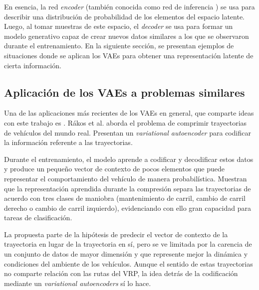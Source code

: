 
En esencia, la red \textit{encoder} (también conocida como red de inferencia \cite{BengioGood} ) se usa para describir una distribución de probabilidad de los elementos del espacio latente. Luego, al tomar muestras de este espacio, el \textit{decoder} se usa para formar un modelo generativo capaz de crear nuevos datos similares a los que se observaron durante el entrenamiento. En la siguiente sección, se presentan ejemplos de situaciones donde se aplican los VAEs para obtener una representación latente de cierta información.


\subsection{Aplicación de los VAEs a problemas similares}

Una de las aplicaciones más recientes de los VAEs en general, que comparte ideas con este trabajo es \cite{TrajectoryCompres}. Rákos et al. aborda el problema de comprimir trayectorias de vehículos del mundo real. Presentan un \textit{variational autoencoder} para codificar la información referente a las trayectorias. 

Durante el entrenamiento, el modelo aprende a codificar y decodificar estos datos y produce un pequeño vector de contexto de pocos elementos que puede representar el comportamiento del vehículo de manera probabilística. Muestran que la representación aprendida durante la compresión separa las trayectorias de acuerdo con tres clases de maniobra (mantenimiento de carril, cambio de carril derecho o cambio de carril izquierdo), evidenciando con ello gran capacidad para tareas de clasificación. 

 La propuesta parte de la hipótesis de predecir el vector de contexto de la trayectoria en lugar de la trayectoria en sí, pero se ve limitada por la carencia de un conjunto de datos de mayor dimensión y que represente mejor la dinámica y condiciones del ambiente de los vehículos. Aunque el sentido de estas trayectorias no comparte relación con las rutas del VRP, la idea detrás de la codificación mediante un \textit{variational autoencoders} sí lo hace.



